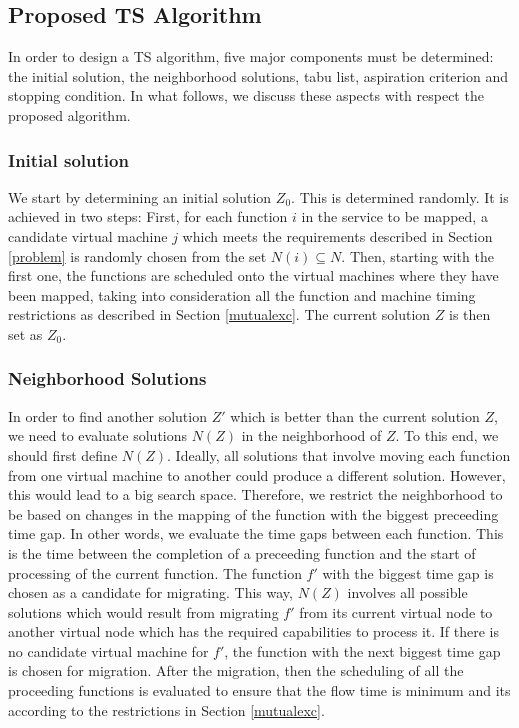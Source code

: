 \documentclass[conference]{IEEEtran}
\begin{document}
\subsection{Proposed TS Algorithm}
In order to design a TS algorithm, five major components must be determined: the initial solution, the neighborhood solutions, tabu list, aspiration criterion and stopping condition. In what follows, we discuss these aspects with respect the proposed algorithm.
\subsubsection{Initial solution} We start by determining an initial solution $Z_0$. This is determined randomly. It is achieved in two steps: First, for each function $i$ in the service to be mapped, a candidate virtual machine $j$ which meets the requirements described in Section \ref{problem} is randomly chosen from the set $N(i) \subseteq N$. Then, starting with the first one, the functions are scheduled onto the virtual machines where they have been mapped, taking into consideration all the function and machine timing restrictions as described in Section \ref{mutualexc}. The current solution $Z$ is then set as $Z_0$.
\subsubsection{Neighborhood Solutions} In order to find another solution $Z'$ which is better than the current solution $Z$, we need to evaluate solutions $N(Z)$ in the neighborhood of $Z$. To this end, we should first define $N(Z)$. Ideally, all solutions that involve moving each function from one virtual machine to another could produce a different solution. However, this would lead to a big search space. Therefore, we restrict the neighborhood to be based on changes in the mapping of the function with the biggest preceeding time gap. In other words, we evaluate the time gaps between each function. This is the time between the completion of a preceeding function and the start of processing of the current function. The function $f'$ with the biggest time gap is chosen as a candidate for migrating. This way, $N(Z)$ involves all possible solutions which would result from migrating $f'$ from its current virtual node to another virtual node which has the required capabilities to process it. If there is no candidate virtual machine for $f'$, the function with the next biggest time gap is chosen for migration. After the migration, then the scheduling of all the proceeding functions is evaluated to ensure that the flow time is minimum and its according to the restrictions in Section \ref{mutualexc}.
\end{document}
